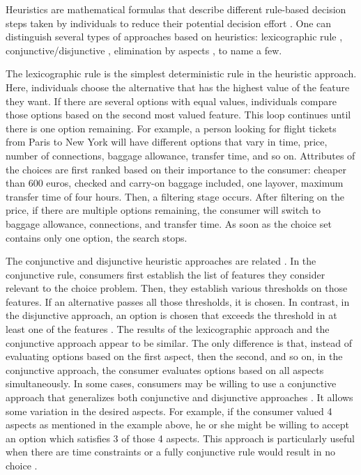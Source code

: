 \documentclass[a4paper,12pt]{article}
\begin{document}
Heuristics are mathematical formulas that describe different rule-based decision steps taken by individuals to reduce their potential decision effort \citep{bettman1998constructive}. One can distinguish several types of approaches based on heuristics: lexicographic rule \citep{fishburn74}, conjunctive/disjunctive \citep{coombs1951mathematical}, elimination by aspects \citep{tversky1972elimination}, to name a few. 

The lexicographic rule is the simplest deterministic rule in the heuristic approach. Here, individuals choose the alternative that has the highest value of the feature they want. If there are several options with equal values, individuals compare those options based on the second most valued feature. This loop continues until there is one option remaining. For example, a person looking for flight tickets from Paris to New York will have different options that vary in time, price, number of connections, baggage allowance, transfer time, and so on. Attributes of the choices are first ranked based on their importance to the consumer: cheaper than 600 euros, checked and carry-on baggage included, one layover, maximum transfer time of four hours. Then, a filtering stage occurs. After filtering on the price, if there are multiple options remaining, the consumer will switch to baggage allowance, connections, and transfer time. As soon as the choice set contains only one option, the search stops.

The conjunctive and disjunctive heuristic approaches are related \citep{coombs1951mathematical}. In the conjunctive rule, consumers first establish the list of features they consider relevant to the choice problem. Then, they establish various thresholds on those features. If an alternative passes all those thresholds, it is chosen. In contrast, in the disjunctive approach, an option is chosen that exceeds the threshold in at least one of the features \citep{coombs1951mathematical}. The results of the lexicographic approach and the conjunctive approach appear to be similar. The only difference is that, instead of evaluating options based on the first aspect, then the second, and so on, in the conjunctive approach, the consumer evaluates options based on all aspects simultaneously. In some cases, consumers may be willing to use a conjunctive approach that generalizes both conjunctive and disjunctive approaches \citep{hauser2014consideration}. It allows some variation in the desired aspects. For example, if the consumer valued 4 aspects as mentioned in the example above, he or she might be willing to accept an option which satisfies 3 of those 4 aspects. This approach is particularly useful when there are time constraints or a fully conjunctive rule would result in no choice \citep{hauser2009non}. 
\end{document}
